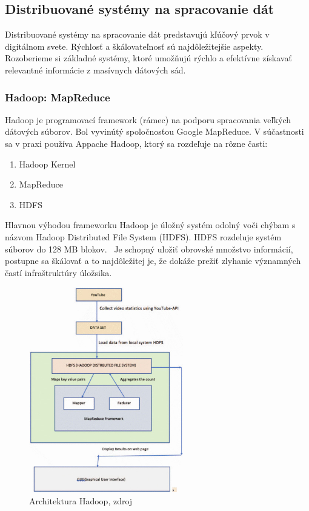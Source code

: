 \documentclass[10pt,twoside,slovak,a4paper]{article}
\begin{document}
\subsection{Distribuované systémy na spracovanie dát} \label{Distribuovane}

Distribuované systémy na spracovanie dát predstavujú kľúčový prvok v digitálnom svete. Rýchlosť a škálovateľnosť sú najdôležitejšie aspekty. Rozoberieme si základné systémy, ktoré umožňujú rýchlo a efektívne získavať relevantné informácie z masívnych dátových sád.

\subsubsection {Hadoop: MapReduce}

Hadoop je programovací framework (rámec) na podporu spracovania veľkých dátových súborov. Bol vyvinútý spoločnosťou Google MapReduce. V súčastnosti sa v praxi používa Appache Hadoop, ktorý sa rozdeľuje na rôzne časti:

\begin{enumerate}
\item Hadoop Kernel
\item MapReduce
\item HDFS
\end{enumerate}

Hlavnou výhodou frameworku Hadoop je úložný systém odolný voči chýbam s názvom Hadoop Distributed File System (HDFS). HDFS rozdeluje systém súborov do 128 MB blokov.~\cite{HDFS} Je schopný uložiť obrovské množstvo informácií, postupne sa škálovať a to najdôležitej je, že dokáže prežiť zlyhanie významných častí infraštruktúry úložsika.
\begin{figure}[H]
  \centering
  \includegraphics[width=0.6\textwidth]{Hadoop.jpg}
  \caption{Architektura Hadoop, zdroj \cite{HadoopObrazok}}
  \label{HadoopObrazok}
\end{figure}
\end{document}
